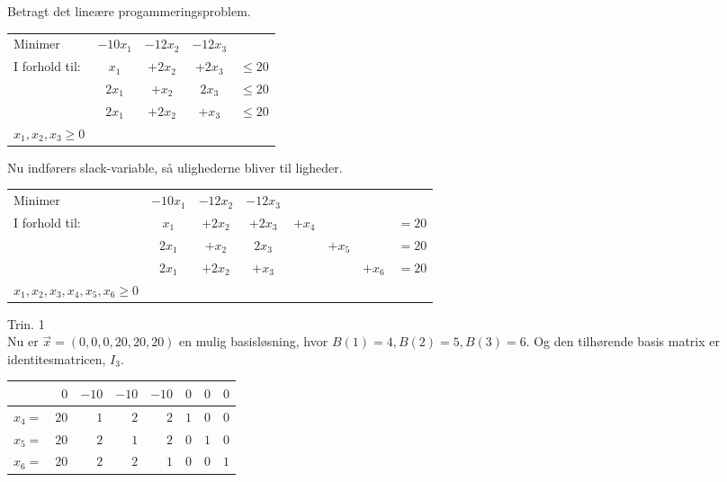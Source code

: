 \begin{eks}
Betragt det lineære progammeringsproblem. 
\begin{center}
\begin{tabular}{ l c c  c  r }
Minimer &$-10x_1$&$-12x_2$ & $-12x_3$&\\
I forhold til: &$x_1$&+$2x_2 $&+$2x_3$ & $\leq 20$\\
&$2x_1$& $+x_2$& $2x_3$ & $\leq 20$\\
&$2x_1$&$+2x_2$&$+x_3$&$\leq 20$\\
$x_1,x_2,x_3\geq 0$
\end{tabular}
\end{center}

Nu indførers slack-variable, så ulighederne bliver til ligheder. 
\begin{center}
\begin{tabular}{ l c c  c c c c r }
Minimer &$-10x_1$&$-12x_2$ & $-12x_3$&&&\\
I forhold til: &$x_1$&+$2x_2 $&+$2x_3$ &$+x_4$&& &$=20$\\
&$2x_1$& $+x_2$& $2x_3$ & & $+x_5$ &&$=20$\\
&$2x_1$&$+2x_2$&$+x_3$&&&$+x_6$&$=20$\\
$x_1,x_2,x_3,x_4,x_5,x_6\geq 0$
\end{tabular}
\end{center}

Trin. 1\\
Nu er $\vec{x}=(0,0,0,20,20,20)$ en mulig basisløsning, hvor $B(1)=4,B(2)=5,B(3)=6$. Og den tilhørende basis matrix er identitesmatricen, $I_3$. 
\begin{center}
\begin{tabular}{r| r|r r r r r r|}
  \hline	
  &$0$&$-10$ &$-10$&$-10$&$0$&$0$&$0$\\ \hline	
  $x_4=$&$20$&$1$&$2$&$2$&$1$&$0$&$0$\\	
  $x_5=$&$20$&$2$&$1$&$2$&$0$&$1$&$0$\\
  $x_6=$&$20$&$2$&$2$&$1$&$0$&$0$&$1$\\
   \hline
\end{tabular}
\end{center}


\end{eks}
